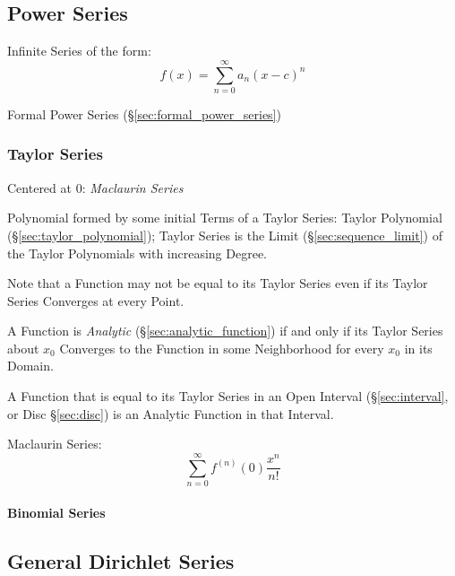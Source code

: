 \subsection{Power Series}\label{sec:power_series}

Infinite Series of the form:
\[
  f(x) = \sum_{n=0}^\infty a_n (x - c)^n
\]

\fist Formal Power Series (\S\ref{sec:formal_power_series})



\subsubsection{Taylor Series}\label{sec:taylor_series}

Centered at $0$: \emph{Maclaurin Series}

Polynomial formed by some initial Terms of a Taylor Series: Taylor
Polynomial (\S\ref{sec:taylor_polynomial}); Taylor Series is the Limit
(\S\ref{sec:sequence_limit}) of the Taylor Polynomials with increasing
Degree.

Note that a Function may not be equal to its Taylor Series even if its
Taylor Series Converges at every Point.

A Function is \emph{Analytic} (\S\ref{sec:analytic_function}) if and only if
its Taylor Series about $x_0$ Converges to the Function in some Neighborhood
for every $x_0$ in its Domain.

A Function that is equal to its Taylor Series in an Open Interval
(\S\ref{sec:interval}, or Disc \S\ref{sec:disc}) is an Analytic Function in
that Interval.

Maclaurin Series:
\[
  \sum_{n=0}^\infty f^{(n)}(0) \frac{x^n}{n!}
\]



\paragraph{Binomial Series}\label{sec:binomial_series}\hfill



\subsection{General Dirichlet Series}\label{sec:general_dirichlet}

